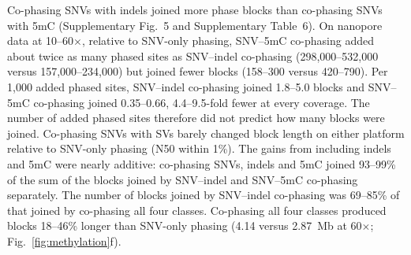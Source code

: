 Co-phasing SNVs with indels joined more phase blocks than co-phasing SNVs with 5mC (Supplementary Fig.~5 and Supplementary Table~6). On nanopore data at 10--60$\times$, relative to SNV-only phasing, SNV--5mC co-phasing added about twice as many phased sites as SNV--indel co-phasing (298,000--532,000 versus 157,000--234,000) but joined fewer blocks (158--300 versus 420--790). Per 1,000 added phased sites, SNV--indel co-phasing joined 1.8--5.0 blocks and SNV--5mC co-phasing joined 0.35--0.66, 4.4--9.5-fold fewer at every coverage. The number of added phased sites therefore did not predict how many blocks were joined. Co-phasing SNVs with SVs barely changed block length on either platform relative to SNV-only phasing (N50 within 1\%). The gains from including indels and 5mC were nearly additive: co-phasing SNVs, indels and 5mC joined 93--99\% of the sum of the blocks joined by SNV--indel and SNV--5mC co-phasing separately. The number of blocks joined by SNV--indel co-phasing was 69--85\% of that joined by co-phasing all four classes. Co-phasing all four classes produced blocks 18--46\% longer than SNV-only phasing (4.14 versus 2.87~Mb at 60$\times$; Fig.~\ref{fig:methylation}f).

